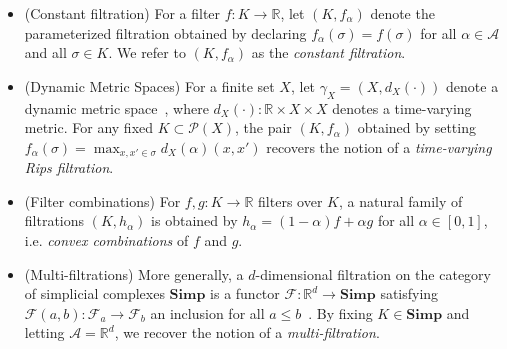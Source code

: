 \begin{itemize}[itemsep=0.25em, parsep=0.25em]
	\item (Constant filtration) For a filter $f : K \to \mathbb{R}$, let $(K, f_\alpha)$ denote the parameterized filtration obtained by declaring $f_\alpha(\sigma) = f(\sigma)$ for all $\alpha \in \mathcal{A}$ and all $\sigma \in K$. We refer to $(K, f_\alpha)$ as the \emph{constant filtration}. 
	\item (Dynamic Metric Spaces) For a finite set $X$, let $\gamma_X = (X, d_X(\cdot))$ denote a dynamic metric space~\cite{kim2021spatiotemporal}, where $d_X(\cdot) : \mathbb{R} \times X \times X$ denotes a time-varying metric. For any fixed $K \subset \mathcal{P}(X)$, the pair $(K, f_\alpha)$ obtained by setting $f_\alpha(\sigma) = \max_{x, x' \in \sigma} d_X(\alpha)(x,x')$ recovers the notion of a \emph{time-varying Rips filtration}.
	\item (Filter combinations) For $f, g: K \to \mathbb{R}$ filters over $K$, a natural family of filtrations $(K, h_\alpha)$ is obtained by $h_\alpha = (1 - \alpha) f + \alpha g$ for all $\alpha \in [0, 1]$, i.e. \emph{convex combinations} of $f$ and $g$.
	\item (Multi-filtrations) More generally, a $d$-dimensional filtration on the category of simplicial complexes $\mathbf{Simp}$ is a functor $\mathcal{F}: \mathbb{R}^d \to \mathbf{Simp}$ satisfying $\mathcal{F}(a, b) : \mathcal{F}_a \to \mathcal{F}_b$ an inclusion for all $a \leq b$~\cite{}. By fixing $K \in \mathbf{Simp}$ and letting $\mathcal{A} = \mathbb{R}^d$, we recover the notion of a \emph{multi-filtration}.
\end{itemize} 



